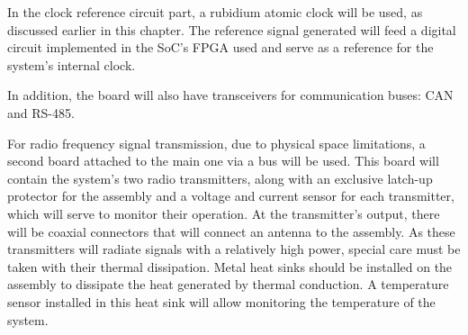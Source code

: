 In the clock reference circuit part, a rubidium atomic clock will be used, as discussed earlier in this chapter. The reference signal generated will feed a digital circuit implemented in the SoC's FPGA used and serve as a reference for the system's internal clock.


In addition, the board will also have transceivers for communication buses: CAN and RS-485.


For radio frequency signal transmission, due to physical space limitations, a second board attached to the main one via a bus will be used. This board will contain the system's two radio transmitters, along with an exclusive latch-up protector for the assembly and a voltage and current sensor for each transmitter, which will serve to monitor their operation. At the transmitter's output, there will be coaxial connectors that will connect an antenna to the assembly. As these transmitters will radiate signals with a relatively high power, special care must be taken with their thermal dissipation. Metal heat sinks should be installed on the assembly to dissipate the heat generated by thermal conduction. A temperature sensor installed in this heat sink will allow monitoring the temperature of the system.

